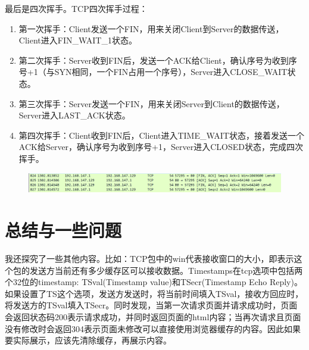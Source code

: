 \documentclass[UTF8,a4paper,10pt]{ctexart}
\begin{document}
最后是四次挥手。TCP四次挥手过程：
\begin{enumerate}
  \item 第一次挥手：Client发送一个FIN，用来关闭Client到Server的数据传送，Client进入FIN\_WAIT\_1状态。
  \item 第二次挥手：Server收到FIN后，发送一个ACK给Client，确认序号为收到序号+1（与SYN相同，一个FIN占用一个序号），Server进入CLOSE\_WAIT状态。
  \item 第三次挥手：Server发送一个FIN，用来关闭Server到Client的数据传送，Server进入LAST\_ACK状态。
  \item 第四次挥手：Client收到FIN后，Client进入TIME\_WAIT状态，接着发送一个ACK给Server，确认序号为收到序号+1，Server进入CLOSED状态，完成四次挥手。
\end{enumerate}
\begin{figure}[H]
    \centering
    \includegraphics[scale=0.4]{17.png}
    \label{fig:17}
\end{figure}
\section{总结与一些问题}
我还探究了一些其他内容。比如：TCP包中的win代表接收窗口的大小，即表示这个包的发送方当前还有多少缓存区可以接收数据。Timestamps在tcp选项中包括两个32位的timestamp: TSval(Timestamp value)和TSecr(Timestamp Echo Reply)。如果设置了TS这个选项，发送方发送时，将当前时间填入TSval，接收方回应时，将发送方的TSval填入TSecr。同时发现，当第一次请求页面并请求成功时，页面会返回状态码200表示请求成功，并同时返回页面的html内容；当再次请求且页面没有修改时会返回304表示页面未修改可以直接使用浏览器缓存的内容。因此如果要实际展示，应该先清除缓存，再展示内容。
\end{document}
